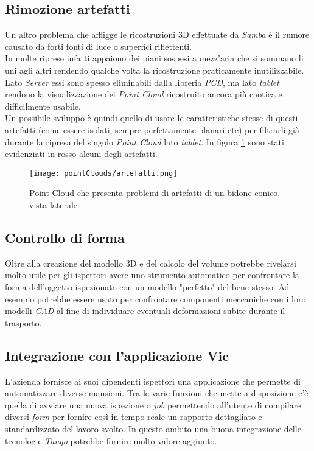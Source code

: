 \subsection{Rimozione artefatti}
Un altro problema che affligge le ricostruzioni 3D effettuate da \emph{Samba} è il rumore causato da forti fonti di luce o superfici riflettenti.\\
In molte riprese infatti appaiono dei piani sospesi a mezz'aria che si sommano li uni agli altri rendendo qualche volta la ricostruzione praticamente inutilizzabile. Lato \emph{Server} essi sono spesso eliminabili dalla libreria \emph{PCD}, ma lato \emph{tablet} rendono la visualizzazione dei \emph{Point Cloud} ricostruito ancora più caotica e difficilmente usabile.\\
Un possibile sviluppo è quindi quello di usare le caratteristiche stesse di questi artefatti (come essere isolati, sempre perfettamente planari etc) per filtrarli già durante la ripresa del singolo \emph{Point Cloud} lato \emph{tablet}. In figura \ref{figure:pcloud_artifacts} sono stati evidenziati in rosso alcuni degli artefatti.
\begin{figure}[!h] 
    \centering 
    \texttt{[image: pointClouds/artefatti.png]} 
    \caption{Point Cloud che presenta problemi di artefatti di un bidone conico, vista laterale}
    \label{figure:pcloud_artifacts}
\end{figure}

\subsection{Controllo di forma}
Oltre alla creazione del modello 3D e del calcolo del volume potrebbe rivelarsi molto utile per gli ispettori avere uno strumento automatico per confrontare la forma dell'oggetto ispezionato con un modello "perfetto" del bene stesso. Ad esempio potrebbe essere usato per confrontare componenti meccaniche con i loro modelli \emph{CAD} al fine di individuare eventuali deformazioni subite durante il trasporto.

\subsection{Integrazione con l'applicazione Vic}
L'azienda fornisce ai suoi dipendenti ispettori una applicazione che permette di automatizzare diverse mansioni. Tra le varie funzioni che mette a disposizione c'è quella di avviare una nuova ispezione o \emph{job} permettendo all'utente di compilare diversi \emph{form} per fornire così in tempo reale un rapporto dettagliato e standardizzato del lavoro svolto. In questo ambito una buona integrazione delle tecnologie \emph{Tango} potrebbe fornire molto valore aggiunto.


